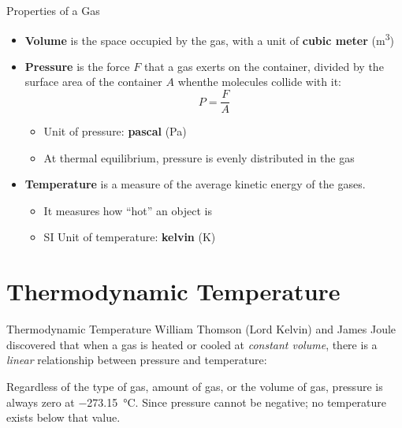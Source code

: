\documentclass[12pt,aspectratio=169]{beamer}
\begin{document}
\begin{frame}{Properties of a Gas}
  \begin{itemize}
  \item\textbf{Volume} is the space occupied by the gas, with a unit of
    \textbf{cubic meter} (\si{\metre^3})
  \item\textbf{Pressure} is the force $F$ that a gas exerts on the container,
    divided by the surface area of the container $A$ whenthe molecules collide
    with it:
    \begin{displaymath}
        P=\frac{F}{A}
    \end{displaymath}
    \begin{itemize}
    \item\vspace{-.2in}Unit of pressure: \textbf{pascal} (\si{\pascal})
    \item At thermal equilibrium, pressure is evenly distributed in the gas
    \end{itemize}
  \item\textbf{Temperature} is a measure of the average kinetic energy of the
    gases.
    \begin{itemize}
    \item It measures how ``hot'' an object is
    \item SI Unit of temperature: \textbf{kelvin} (\si{\kelvin})
    \end{itemize}
  \end{itemize}
\end{frame}


\section{Thermodynamic Temperature}

\begin{frame}{Thermodynamic Temperature}
  William Thomson (Lord Kelvin) and James Joule discovered that when a gas is
  heated or cooled at \emph{constant volume}, there is a \emph{linear}
  relationship between pressure and temperature:
  \begin{center}
  \end{center}
  Regardless of the type of gas, amount of gas, or the volume of gas, pressure
  is always zero at \SI{-273.15}{\celsius}. Since pressure cannot be negative;
  no temperature exists below that value.
\end{frame}
\end{document}
